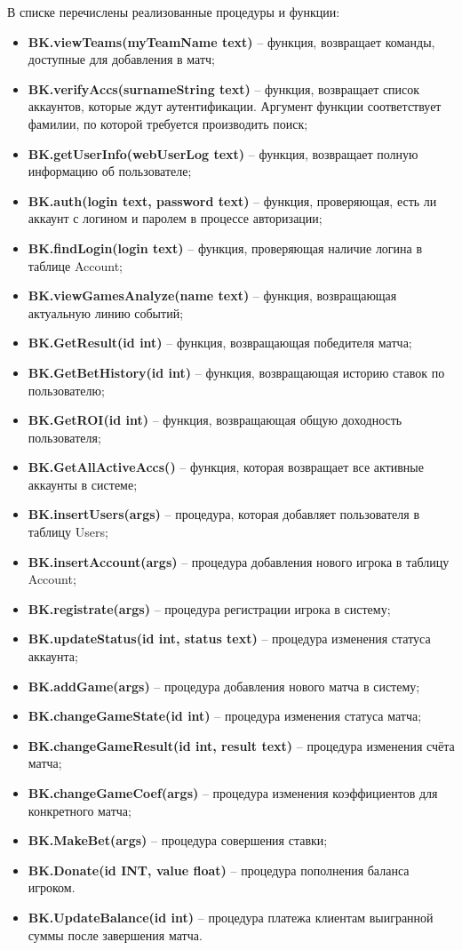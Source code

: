 В списке перечислены реализованные процедуры и функции:
\begin{itemize}
	\item \textbf{BK.viewTeams(myTeamName text)} -- функция, возвращает команды, доступные для добавления в матч;
	\item \textbf{BK.verifyAccs(surnameString text)} -- функция, возвращает список аккаунтов, которые ждут аутентификации. Аргумент функции соответствует фамилии, по которой требуется производить поиск;
	\item \textbf{BK.getUserInfo(webUserLog text)} -- функция, возвращает полную информацию об пользователе;
	\item \textbf{BK.auth(login text, password text)} -- функция, проверяющая, есть ли аккаунт с логином и паролем в процессе авторизации;
	\item \textbf{BK.findLogin(login text)} -- функция, проверяющая наличие логина в таблице Account;
	\item \textbf{BK.viewGamesAnalyze(name text)} -- функция, возвращающая актуальную линию событий;
	\item \textbf{BK.GetResult(id int)} -- функция, возвращающая победителя матча;
	\item \textbf{BK.GetBetHistory(id int)} -- функция, возвращающая историю ставок по пользователю;
	\item \textbf{BK.GetROI(id int)} -- функция, возвращающая общую доходность пользователя;
	\item \textbf{BK.GetAllActiveAccs()} -- функция, которая возвращает все активные аккаунты в системе;
	\item \textbf{BK.insertUsers(args)} -- процедура, которая добавляет пользователя в таблицу Users;
	\item \textbf{BK.insertAccount(args)} -- процедура добавления нового игрока в таблицу Account;
	\item \textbf{BK.registrate(args)} -- процедура регистрации игрока в систему;
	\item \textbf{BK.updateStatus(id int, status text)} -- процедура изменения статуса аккаунта;
	\item \textbf{BK.addGame(args)} -- процедура добавления нового матча в систему;
	\item \textbf{BK.changeGameState(id int)} -- процедура изменения статуса матча;
	\item \textbf{BK.changeGameResult(id int, result text)} -- процедура изменения счёта матча;
	\item \textbf{BK.changeGameCoef(args)} -- процедура изменения коэффициентов для конкретного матча;
	\item \textbf{BK.MakeBet(args)} -- процедура совершения ставки;
	\item \textbf{BK.Donate(id INT, value float)} -- процедура пополнения баланса игроком.
	\item \textbf{BK.UpdateBalance(id int)} -- процедура платежа клиентам выигранной суммы после завершения матча.
\end{itemize}

